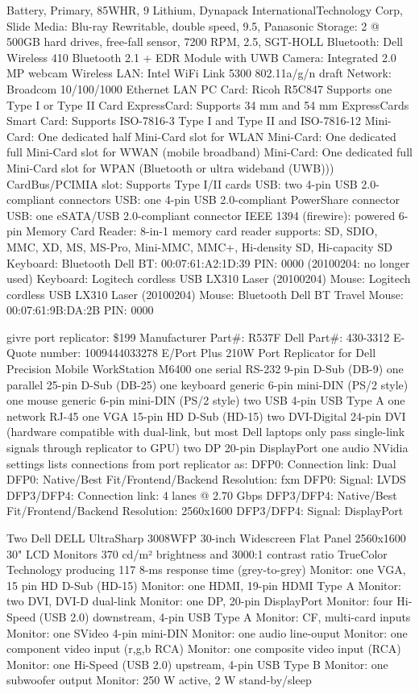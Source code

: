 \documentclass[12pt,twoside]{article}
\begin{document}
Battery, Primary, 85WHR, 9 Lithium, Dynapack InternationalTechnology Corp, Slide
Media: Blu-ray Rewritable, double speed, 9.5, Panasonic
Storage: 2 @ 500GB hard drives, free-fall sensor, 7200 RPM, 2.5, SGT-HOLL
Bluetooth: Dell Wireless 410 Bluetooth 2.1 + EDR Module with UWB
Camera: Integrated 2.0 MP webcam
Wireless LAN: Intel WiFi Link 5300 802.11a/g/n draft
Network: Broadcom 10/100/1000 Ethernet LAN
PC Card: Ricoh R5C847 Supports one Type I or Type II Card
ExpressCard: Supports 34 mm and 54 mm ExpressCards
Smart Card: Supports ISO-7816-3 Type I and Type II and ISO-7816-12
Mini-Card: One dedicated half Mini-Card slot for WLAN
Mini-Card: One dedicated full Mini-Card slot for WWAN (mobile broadband)
Mini-Card: One dedicated full Mini-Card slot for WPAN (Bluetooth or ultra wideband (UWB)))
CardBus/PCIMIA slot: Supports Type I/II cards
USB: two 4-pin USB 2.0-compliant connectors
USB: one 4-pin USB 2.0-compliant PowerShare connector
USB: one eSATA/USB 2.0-compliant connector
IEEE 1394 (firewire): powered 6-pin
Memory Card Reader: 8-in-1 memory card reader supports: 
SD, SDIO, MMC, XD, MS, MS-Pro, Mini-MMC, MMC+, Hi-density SD, Hi-capacity SD
Keyboard: Bluetooth Dell BT: 00:07:61:A2:1D:39 PIN: 0000 (20100204: no longer used)
Keyboard: Logitech cordless USB LX310 Laser (20100204)
Mouse: Logitech cordless USB LX310 Laser (20100204)
Mouse: Bluetooth Dell BT Travel Mouse: 00:07:61:9B:DA:2B PIN: 0000

givre port replicator: \$199
Manufacturer Part\#: R537F
Dell Part\#: 430-3312
E-Quote number: 1009444033278
E/Port Plus 210W Port Replicator for Dell Precision Mobile WorkStation M6400
one serial RS-232 9-pin D-Sub (DB-9) 
one parallel 25-pin D-Sub (DB-25) 
one keyboard generic 6-pin mini-DIN (PS/2 style) 
one mouse generic 6-pin mini-DIN (PS/2 style) 
two USB 4-pin USB Type A 
one network RJ-45 
one VGA 15-pin HD D-Sub (HD-15) 
two DVI-Digital 24-pin DVI (hardware compatible with dual-link, but most Dell laptops only pass single-link signals through replicator to GPU)
two DP 20-pin DisplayPort
one audio
NVidia settings lists connections from port replicator as:
DFP0: Connection link: Dual
DFP0: Native/Best Fit/Frontend/Backend Resolution: fxm
DFP0: Signal: LVDS
DFP3/DFP4: Connection link: 4 lanes @ 2.70 Gbps
DFP3/DFP4: Native/Best Fit/Frontend/Backend Resolution: 2560x1600
DFP3/DFP4: Signal: DisplayPort

Two Dell DELL UltraSharp 3008WFP 30-inch Widescreen Flat Panel 
2560x1600 30" LCD Monitors
370 cd/m² brightness and 3000:1 contrast ratio
TrueColor Technology producing 117%
8-ms response time (grey-to-grey)
Monitor: one VGA, 15 pin HD D-Sub (HD-15)
Monitor: one HDMI, 19-pin HDMI Type A
Monitor: two DVI, DVI-D dual-link
Monitor: one DP, 20-pin DisplayPort
Monitor: four Hi-Speed (USB 2.0) downstream, 4-pin USB Type A
Monitor: CF, multi-card inputs
Monitor: one SVideo 4-pin mini-DIN
Monitor: one audio line-ouput
Monitor: one component video input (r,g,b RCA)
Monitor: one composite video input (RCA)
Monitor: one Hi-Speed (USB 2.0) upstream, 4-pin USB Type B
Monitor: one subwoofer output
Monitor: 250 W active, 2 W stand-by/sleep
\end{document}
